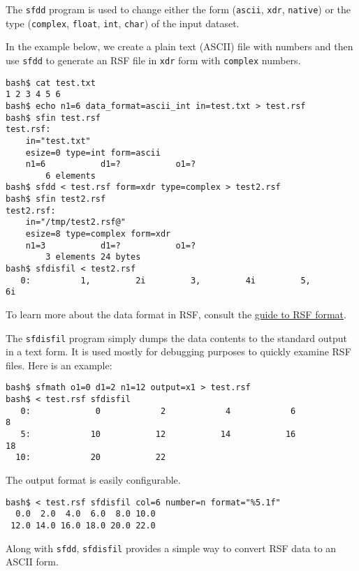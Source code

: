 \noindent\doublebox{\parbox{\textwidth}{

}}

The \texttt{sfdd} program is used to change either the form (\texttt{ascii},
\texttt{xdr}, \texttt{native}) or the type (\texttt{complex}, \texttt{float},
\texttt{int}, \texttt{char}) of the input dataset. 

In the example below, we create a plain text (ASCII) file with numbers and
then use \texttt{sfdd} to generate an RSF file in \texttt{xdr} form with
\texttt{complex} numbers. 
\begin{verbatim}
bash$ cat test.txt
1 2 3 4 5 6
bash$ echo n1=6 data_format=ascii_int in=test.txt > test.rsf
bash$ sfin test.rsf
test.rsf:
    in="test.txt"
    esize=0 type=int form=ascii
    n1=6           d1=?           o1=?
        6 elements
bash$ sfdd < test.rsf form=xdr type=complex > test2.rsf
bash$ sfin test2.rsf
test2.rsf:
    in="/tmp/test2.rsf@"
    esize=8 type=complex form=xdr
    n1=3           d1=?           o1=?
        3 elements 24 bytes
bash$ sfdisfil < test2.rsf
   0:          1,         2i         3,         4i         5,         6i
\end{verbatim}

To learn more about the data format in RSF, consult the
\href{http://www.reproducibility.org/RSF/book/rsf/rsf/format_html/}{guide to RSF
  format}.

\noindent\doublebox{\parbox{\textwidth}{

}}

The \texttt{sfdisfil} program simply dumps the data contents to the standard
output in a text form. It is used mostly for debugging purposes to quickly
examine RSF files. Here is an example:
\begin{verbatim}
bash$ sfmath o1=0 d1=2 n1=12 output=x1 > test.rsf
bash$ < test.rsf sfdisfil
   0:             0            2            4            6            8
   5:            10           12           14           16           18
  10:            20           22
\end{verbatim}
The output format is easily configurable.
\begin{verbatim}
bash$ < test.rsf sfdisfil col=6 number=n format="%5.1f"
  0.0  2.0  4.0  6.0  8.0 10.0
 12.0 14.0 16.0 18.0 20.0 22.0
\end{verbatim}
Along with \texttt{sfdd}, \texttt{sfdisfil} provides a simple way to convert
RSF data to an ASCII form.

\noindent\doublebox{\parbox{\textwidth}{
    
}}

